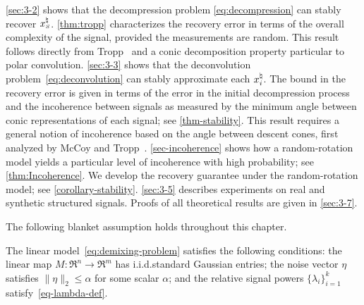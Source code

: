 \autoref{sec:3-2} shows that the decompression problem \eqref{eq:decompression} can stably recover $x_{\scriptscriptstyle S}^{\natural}$. \autoref{thm:tropp} characterizes the recovery error in terms of the overall complexity of the signal, provided the measurements are random. This result follows directly from Tropp~\cite{tropp2015convex} and a conic decomposition property particular to polar convolution. \autoref{sec:3-3} shows that the deconvolution problem~\eqref{eq:deconvolution} can stably approximate each $x_i^{\natural}$. The bound in the recovery error is given in terms of the error in the initial decompression process and the incoherence between signals as measured by the minimum angle between conic representations of each signal; see \autoref{thm-stability}. This result requires a general notion of incoherence based on the angle between descent cones, first analyzed by McCoy and Tropp~\cite{mccoy2013achievable}.  \autoref{sec-incoherence} shows how a random-rotation model yields a particular level of incoherence with high probability; see \autoref{thm:Incoherence}. We develop the recovery guarantee under the random-rotation model; see \autoref{corollary-stability}. \autoref{sec:3-5} describes experiments on real and synthetic structured signals. Proofs of all theoretical results are given in \autoref{sec:3-7}.

The following blanket assumption holds throughout this chapter.
\begin{assumption}\label{assume-blanket}
  The linear model~\eqref{eq:demixing-problem} satisfies the following conditions: the linear map
  $M:\Re^n\to\Re^m$ has i.i.d.\@ standard Gaussian entries; the noise vector $\eta$ satisfies $\|\eta\|_2\leq \alpha$ for some scalar $\alpha$; and the relative signal powers $\{\lambda_i\}_{i=1}^k$ satisfy~\eqref{eq-lambda-def}.
\end{assumption} 



